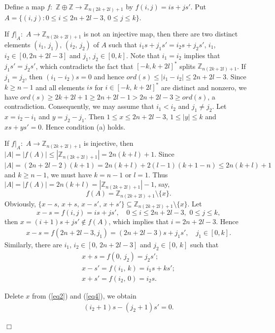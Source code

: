 \documentclass[12pt]{article}
\newtheorem{open problem}{Open problem}[section]
\newenvironment{proof}{\trivlist
      \item[\hskip\labelsep
      {\itshape Proof.}]\normalfont}
      {\hspace*{\fill}$\Box$\endtrivlist}
\begin{document}
\begin{proof}
Define  a map $f:$ $\mathbb{Z}\oplus \mathbb{Z}\rightarrow \mathbb{Z}_{n(2k+2l)+1}$ by $f(i,j)=is+js'$.
Put $A=\{(i,j):0\leq i\leq 2n+2l-3, \, 0\leq j\leq k\}$.

If $f|_A:$ $A\rightarrow \mathbb{Z}_{n(2k+2l)+1}$ is not an injective map,
then there are two distinct elements $(i_1, \,j_1)$, $(i_2, \,j_2)$ of $A$ such that
$i_1s+j_1s'=i_2s+j_2s'$,  $i_1$,  $i_2\in [0,2n+2l-3]$ and $j_1$, $j_2\in [0,k]$. Note that
$i_1=i_2$ implies that $j_1s'=j_2s'$, which contradicts the fact that $[-k,k+2l]^*$ splits  $\mathbb{Z}_{n(2k+2l)+1}$.
If $j_1=j_2$, then $(i_1-i_2)s=0$ and hence $ord(s)\leq |i_1-i_2|\leq 2n+2l-3$.
Since $k\geq n-1$ and all elements $is$ for $i\in [-k, \,k+2l]^\ast$ are distinct and nonzero,
we have $ord(s)\geq 2k+2l+1\geq 2n+2l-1>2n+2l-3\geq ord(s)$, a contradiction.
Consequently, we may assume that $i_1<i_2$ and $j_1\neq j_2$.
Let $x=i_2-i_1$ and $y=j_2-j_1$.
Then $1\leq x\leq 2n+2l-3$, $1\leq |y|\leq k$ and $xs+ys'=0$. Hence condition (a) holds.

If $f|_A:$ $A\rightarrow \mathbb{Z}_{n(2k+2l)+1}$ is injective,
then $|A|=|f(A)|\leq |\mathbb{Z}_{n(2k+2l)+1}|=2n(k+l)+1$.
Since $|A|=(2n+2l-2)(k+1)=2n(k+l)+2(l-1)(k+1-n)\le 2n(k+l)+1$ and $k\ge n-1$,
we must have $k=n-1$ or $l=1$.
Thus $|A|=|f(A)|=2n(k+l)=|\mathbb{Z}_{n(2k+2l)+1}|-1$, say,  $$f(A)=\mathbb{Z}_{n(2k+2l)+1}\setminus\{x\}.$$
Obviously,  $\{x-s, \,x+s, \, x-s', \,x+s'\}\subseteq \mathbb{Z}_{n(2k+2l)+1}\setminus\{x\}$. Let
$$x-s=f(i, j)=is+js', \quad 0\le i\le 2n+2l-3, \,\, 0\le j\le k,$$
then $x=(i+1)s+js'\not\in f(A)$, which implies that $i=2n+2l-3$. Hence
\begin{gather}
x-s=f(2n+2l-3,j_1)=(2n+2l-3)s+j_1s', \quad j_1 \in [0,k]. \label{eq1}
\end{gather}
Similarly, there are $i_1$,  $i_2\in [0, \,2n+2l-3]$ and $j_2\in [0, \,k]$ such that
\begin{gather}
x+s=f(0, \,j_2)=j_2s';   \label{eq2} \\
x-s'=f(i_1, \,k)=i_1s+ks';   \label{eq3} \\
x+s'=f(i_2, \,0)=i_2s.    \label{eq4}
\end{gather}

Delete $x$ from (\ref{eq2}) and (\ref{eq4}), we obtain
\begin{gather}(i_2+1)s-(j_2+1)s'=0.   \label{eq5}
\end{gather}


\end{proof}
\end{document}

